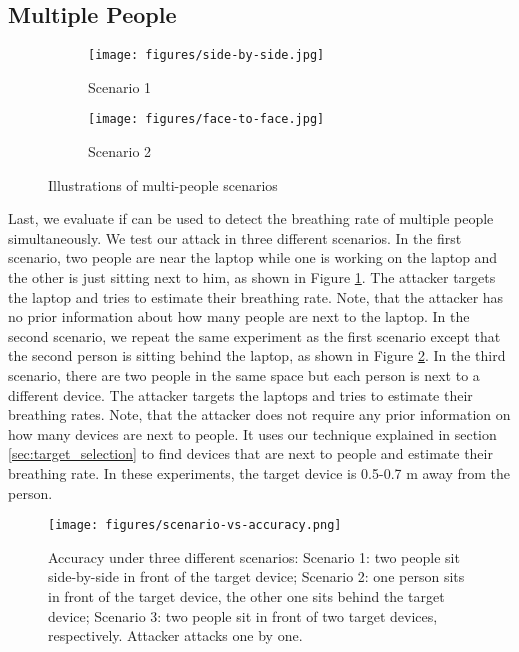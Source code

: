 \subsection{Multiple People}
\begin{figure}[!t]
    \centering
    \begin{subfigure}[b]{0.17\textwidth}
        \centering 
        \texttt{[image: figures/side-by-side.jpg]}
        \caption{Scenario 1}
        \label{fig:scene1}
    \end{subfigure}
    \hfill
    \begin{subfigure}[b]{0.3\textwidth}
        \centering
        \texttt{[image: figures/face-to-face.jpg]}
        \caption{Scenario 2}
        \label{fig:scene2}
    \end{subfigure}
    \caption{Illustrations of multi-people scenarios}
    \label{fig:two-scenes}
\end{figure}
Last, we evaluate if \wisneak can be used to detect the breathing rate of multiple people simultaneously. We test our attack in three different scenarios. In the first scenario, two people are near the laptop while one is working on the laptop and the other is just sitting next to him, as shown in Figure \ref{fig:scene1}. The attacker targets the laptop and tries to estimate their breathing rate. Note, that the attacker has no prior information about how many people are next to the laptop. In the second scenario, we repeat the same experiment as the first scenario except that the second person is sitting behind the laptop, as shown in Figure \ref{fig:scene2}. In the third scenario, there are two people in the same space but each person is next to a different device. The attacker targets the laptops and tries to estimate their breathing rates. Note, that the attacker does not require any prior information on how many devices are next to people. It uses our technique explained in section \ref{sec:target_selection} to find devices that are next to people and estimate their breathing rate. In these experiments, the target device is 0.5-0.7 m away from the person. 

\begin{figure}
    \centering
    \texttt{[image: figures/scenario-vs-accuracy.png]}
    \caption{Accuracy under three different scenarios: Scenario 1: two people sit side-by-side in front of the target device; Scenario 2: one person sits in front of the target device, the other one sits behind the target device; Scenario 3: two people sit in front of two target devices, respectively. Attacker attacks one by one.}
    \label{fig:scenarios_vs_accuracy}
\end{figure}

